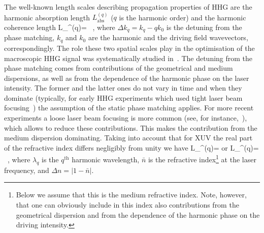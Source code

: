The well-known length scales describing propagation properties of HHG are the harmonic absorption length $L_\mathrm{abs}^{(q)}$ ($q$ is the harmonic order) and the harmonic coherence length
L_^{(q)}=  \, ,    
\eeq
where ${\Delta k_q} = k_{q}-q k_0$ is the detuning from the phase matching, $k_{q}$ and $k_0$ are the harmonic and the driving field wavevectors, correspondingly. The role these two spatial scales play in the optimisation of the macroscopic HHG signal was systematically studied in~\cite{Constant}. The detuning from the phase matching comes from contributions of the geometrical and medium dispersions, as well as from the dependence of the harmonic phase on the laser intensity. The former and the latter ones do not vary in time and when they dominate (typically, for early HHG experiments which used tight laser beam focusing~\cite{Sarukura1991, Sakai1994}) the assumption of the static phase matching applies. For more recent experiments a loose laser beam focusing is more common (see, for instance,~\cite{Takahashi2003, Kovacs2019, Hoflund2021}), which allows to reduce these contributions. This makes the contribution from the medium dispersion dominating. Taking into account that for XUV the real part of the refractive index differs negligibly from unity we have
L_^{(q)}=  \; \; \; \textrm{or} \; \; \; L_^{(q)}=  \, ,
\eeq
where $\lambda_q$ is the $q^\mathrm{th}$ harmonic wavelength, $\bar n$ is the refractive index\footnote{Below we assume that this is the medium refractive index. Note, however, that one can obviously include in this index also contributions from the geometrical dispersion and from the dependence of the harmonic phase on the driving intensity.} at the laser frequency, and $ \Delta n = |1 -\bar n|$. 


